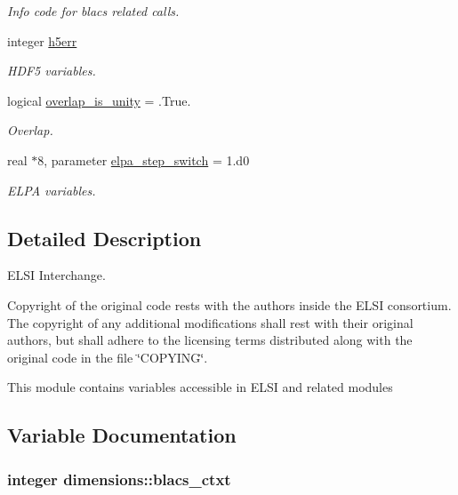 \begin{DoxyCompactItemize}
\begin{DoxyCompactList}\small\item\em Info code for blacs related calls. \end{DoxyCompactList}\item 
integer \hyperlink{namespacedimensions_a243ee55b5b7e8f7c8bfd83e901331bc3}{h5err}
\begin{DoxyCompactList}\small\item\em H\+D\+F5 variables. \end{DoxyCompactList}\item 
logical \hyperlink{namespacedimensions_a93911be2b2a6f6b0dda974846dbf5973}{overlap\+\_\+is\+\_\+unity} = .True.
\begin{DoxyCompactList}\small\item\em Overlap. \end{DoxyCompactList}\item 
real $\ast$8, parameter \hyperlink{namespacedimensions_a9ba7a66f9ea734e4a601d9a958e97410}{elpa\+\_\+step\+\_\+switch} = 1.d0
\begin{DoxyCompactList}\small\item\em E\+L\+P\+A variables. \end{DoxyCompactList}\end{DoxyCompactItemize}


\subsection{Detailed Description}
E\+L\+S\+I Interchange. 

Copyright of the original code rests with the authors inside the E\+L\+S\+I consortium. The copyright of any additional modifications shall rest with their original authors, but shall adhere to the licensing terms distributed along with the original code in the file \char`\"{}\+C\+O\+P\+Y\+I\+N\+G\char`\"{}.

This module contains variables accessible in E\+L\+S\+I and related modules 

\subsection{Variable Documentation}
\hypertarget{namespacedimensions_a3db5b35c702a41e8491992c968e690ae}{}
\subsubsection[{blacs\+\_\+ctxt}]{\setlength{\rightskip}{0pt plus 5cm}integer dimensions\+::blacs\+\_\+ctxt}\label{namespacedimensions_a3db5b35c702a41e8491992c968e690ae}


